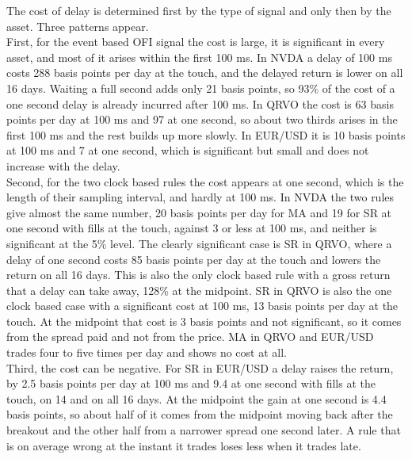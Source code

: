 \documentclass{article}
\begin{document}
\noindent The cost of delay is determined first by the type of signal and only then by the asset. Three patterns appear.\\

\noindent First, for the event based OFI signal the cost is large, it is significant in every asset, and most of it arises within the first 100 ms. In NVDA a delay of 100 ms costs 288 basis points per day at the touch, and the delayed return is lower on all 16 days. Waiting a full second adds only 21 basis points, so 93\% of the cost of a one second delay is already incurred after 100 ms. In QRVO the cost is 63 basis points per day at 100 ms and 97 at one second, so about two thirds arises in the first 100 ms and the rest builds up more slowly. In EUR/USD it is 10 basis points at 100 ms and 7 at one second, which is significant but small and does not increase with the delay.\\

\noindent Second, for the two clock based rules the cost appears at one second, which is the length of their sampling interval, and hardly at 100 ms. In NVDA the two rules give almost the same number, 20 basis points per day for MA and 19 for SR at one second with fills at the touch, against 3 or less at 100 ms, and neither is significant at the 5\% level. The clearly significant case is SR in QRVO, where a delay of one second costs 85 basis points per day at the touch and lowers the return on all 16 days. This is also the only clock based rule with a gross return that a delay can take away, 128\% at the midpoint. SR in QRVO is also the one clock based case with a significant cost at 100 ms, 13 basis points per day at the touch. At the midpoint that cost is 3 basis points and not significant, so it comes from the spread paid and not from the price. MA in QRVO and EUR/USD trades four to five times per day and shows no cost at all.\\

\noindent Third, the cost can be negative. For SR in EUR/USD a delay raises the return, by 2.5 basis points per day at 100 ms and 9.4 at one second with fills at the touch, on 14 and on all 16 days. At the midpoint the gain at one second is 4.4 basis points, so about half of it comes from the midpoint moving back after the breakout and the other half from a narrower spread one second later. A rule that is on average wrong at the instant it trades loses less when it trades late.\\
\end{document}
